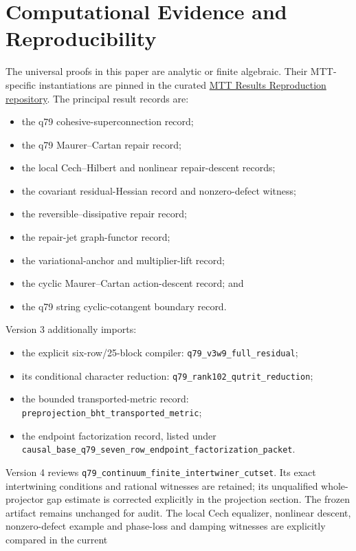 \documentclass[11pt,a4paper]{article}
\begin{document}
\section*{Computational Evidence and Reproducibility}
The universal proofs in this paper are analytic or finite algebraic.  Their
MTT-specific instantiations are pinned in the curated
\href{https://github.com/PeterNero/mtt-results-repro}{MTT Results
Reproduction repository}.  The principal result records are:
\begin{itemize}
\item the q79 cohesive-superconnection record;
\item the q79 Maurer--Cartan repair record;
\item the local Cech--Hilbert and nonlinear repair-descent records;
\item the covariant residual-Hessian record and nonzero-defect witness;
\item the reversible--dissipative repair record;
\item the repair-jet graph-functor record;
\item the variational-anchor and multiplier-lift record;
\item the cyclic Maurer--Cartan action-descent record; and
\item the q79 string cyclic-cotangent boundary record.
\end{itemize}
Version 3 additionally imports:
\begin{itemize}
\item the explicit six-row/25-block compiler:
\texttt{q79\_v3w9\_full\_residual};
\item its conditional character reduction:
\texttt{q79\_rank102\_qutrit\_reduction};
\item the bounded transported-metric record:
\texttt{preprojection\_bht\_transported\_metric};
\item the endpoint factorization record, listed under\\
\texttt{causal\_base\_q79\_seven\_row\_endpoint\_factorization\_packet}.
\end{itemize}
Version 4 reviews \texttt{q79\_continuum\_finite\_intertwiner\_cutset}.
Its exact intertwining conditions and rational witnesses are retained;
its unqualified whole-projector gap estimate is corrected explicitly in
the projection section. The frozen artifact remains unchanged for audit.
The local Cech equalizer, nonlinear descent, nonzero-defect example and
phase-loss and damping witnesses are explicitly compared in the current
\end{document}
